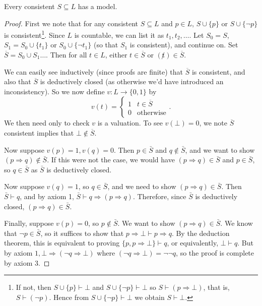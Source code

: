 \documentclass[a4paper, 10pt, twocolumn]{amsart}
\begin{document}
\begin{theorem}
Every consistent $S \subseteq L$ has a model.
\end{theorem}
\begin{proof}
  First we note that for any consistent $S \subseteq L$ and $p \in L$, $S \cup \{p\}$ or $S \cup \{\lnot p\}$ is consistent\footnote{If not, then $S \cup \{p\} \vdash \bot$ and $S \cup \{\lnot p\} \vdash \bot$ so $S \vdash (p \Rightarrow \bot)$, that is, $S \vdash (\lnot p)$. Hence from $S \cup \{\lnot p\} \vdash \bot$ we obtain $S \vdash \bot$.}. Since $L$ is countable, we can list it as $t_1, t_2, \dots$. 
  Let $S_0 = S$, $S_1 = S_0 \cup \{t_1\}$ or $S_0 \cup \{\lnot t_1\}$ (so that $S_1$ is consistent), and continue on. Set $\overline{S} = S_0 \cup S_1 \dots$. Then for all $t \in L$, either $t \in \overline{S}$ or $(\not t) \in \overline{S}$.

  We can easily see inductively (since proofs are finite) that $\overline{S}$ is consistent, and also that $\overline{S}$ is deductively closed (as otherwise we'd have introduced an inconsistency). So we now define $v: L \rightarrow \{0, 1\}$ by
  $$
  v(t) = \begin{cases}
        1 & t \in \overline{S}\\
        0 & \text{otherwise}
       \end{cases}.
  $$
  We then need only to check $v$ is a valuation. To see $v(\bot) = 0$, we note $\overline{S}$ consistent implies that $\bot \not \in \overline{S}$. 

  Now suppose $v(p)=1, v(q)=0$. Then $p \in \bar{S}$ and $q \notin \bar{S}$, and we want to show $(p \Rightarrow q) \notin \bar{S}$. If this were not the case, we would have $(p \Rightarrow q) \in \bar{S}$ and $p \in \bar{S}$, so $q \in \bar{S}$ as $\bar{S}$ is deductively closed.

  Now suppose $v(q)=1$, so $q \in \bar{S}$, and we need to show $(p \Rightarrow q) \in \bar{S}$. Then $\bar{S} \vdash q$, and by axiom 1, $\bar{S} \vdash q \Rightarrow(p \Rightarrow q)$. Therefore, since $\bar{S}$ is deductively closed, $(p \Rightarrow q) \in \bar{S}$.

  Finally, suppose $v(p)=0$, so $p \notin \bar{S}$. We want to show $(p \Rightarrow q) \in \bar{S}$. We know that $\neg p \in \bar{S}$, so it suffices to show that $p \Rightarrow \bot \vdash p \Rightarrow q$. By the deduction theorem, this is equivalent to proving $\{p, p \Rightarrow \bot\} \vdash q$, or equivalently, $\bot \vdash q$. But by axiom $1, \bot \Rightarrow(\neg q \Rightarrow \bot)$ where $(\neg q \Rightarrow \bot)=\neg \neg q$, so the proof is complete by axiom 3.
\end{proof}
\end{document}
